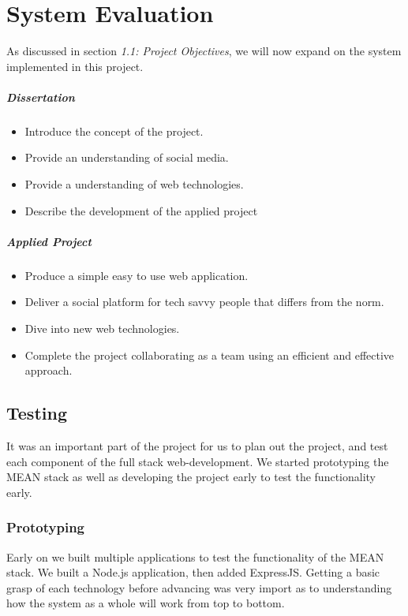 \chapter{System Evaluation} \label{eval}
As discussed in section \textit{1.1: Project Objectives}, we will now expand on the system implemented in this project.

\paragraph{Dissertation}
\begin{itemize}
\item Introduce the concept of the project. 
\item Provide an understanding of social media.
\item Provide a understanding of web technologies.
\item Describe the development of the applied project
\end{itemize}
 
 \paragraph{Applied Project}
\begin{itemize}
\item Produce a simple easy to use web application.
\item Deliver a social platform for tech savvy people that differs from the norm.
\item Dive into new web technologies.
\item Complete the project collaborating as a team using an efficient and effective approach.
\end{itemize}

\section{Testing}
It was an important part of the project for us to plan out the project, and test each component of the full stack web-development. We started prototyping the MEAN stack as well as developing the project early to test the functionality early.

\subsection{Prototyping}
Early on we built multiple applications to test the functionality of the MEAN stack. We built a Node.js application, then added ExpressJS. Getting a basic grasp of each technology before advancing was very import as to understanding how the system as a whole will work from top to bottom.

